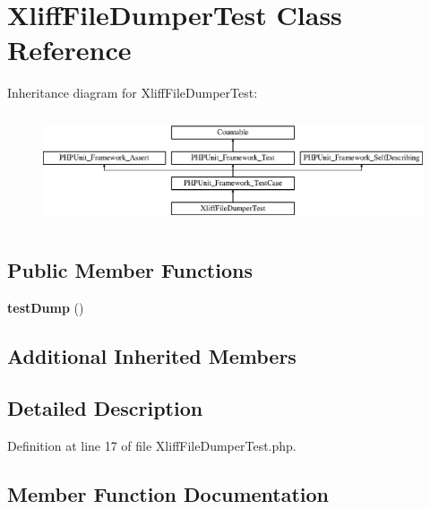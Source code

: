 \section{Xliff\+File\+Dumper\+Test Class Reference}
\label{class_symfony_1_1_component_1_1_translation_1_1_tests_1_1_dumper_1_1_xliff_file_dumper_test}
Inheritance diagram for Xliff\+File\+Dumper\+Test\+:\begin{figure}[H]
\begin{center}
\leavevmode
\includegraphics[height=3.303835cm]{class_symfony_1_1_component_1_1_translation_1_1_tests_1_1_dumper_1_1_xliff_file_dumper_test}
\end{center}
\end{figure}
\subsection*{Public Member Functions}
\begin{DoxyCompactItemize}
\item 
{\bf test\+Dump} ()
\end{DoxyCompactItemize}
\subsection*{Additional Inherited Members}


\subsection{Detailed Description}


Definition at line 17 of file Xliff\+File\+Dumper\+Test.\+php.



\subsection{Member Function Documentation}
